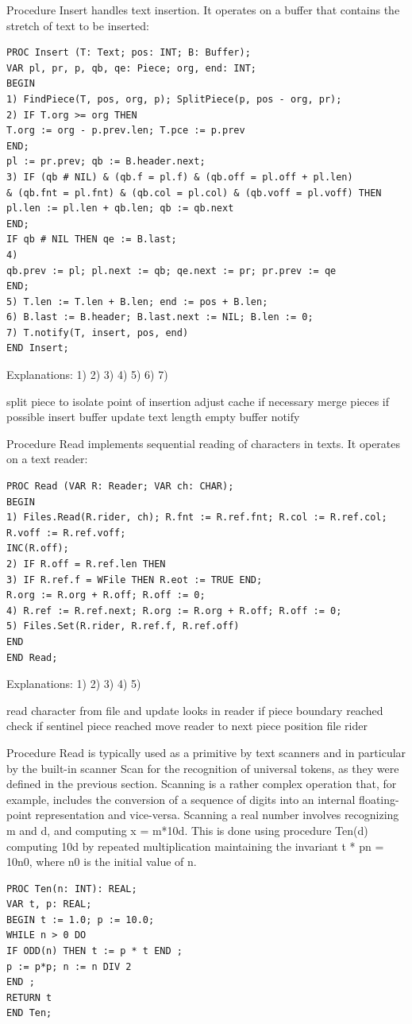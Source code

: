 Procedure Insert handles text insertion. It operates on a buffer that contains the stretch of text to be inserted:
\begin{verbatim}
PROC Insert (T: Text; pos: INT; B: Buffer);
VAR pl, pr, p, qb, qe: Piece; org, end: INT;
BEGIN
1) FindPiece(T, pos, org, p); SplitPiece(p, pos - org, pr);
2) IF T.org >= org THEN
T.org := org - p.prev.len; T.pce := p.prev
END;
pl := pr.prev; qb := B.header.next;
3) IF (qb # NIL) & (qb.f = pl.f) & (qb.off = pl.off + pl.len)
& (qb.fnt = pl.fnt) & (qb.col = pl.col) & (qb.voff = pl.voff) THEN
pl.len := pl.len + qb.len; qb := qb.next
END;
IF qb # NIL THEN qe := B.last;
4)
qb.prev := pl; pl.next := qb; qe.next := pr; pr.prev := qe
END;
5) T.len := T.len + B.len; end := pos + B.len;
6) B.last := B.header; B.last.next := NIL; B.len := 0;
7) T.notify(T, insert, pos, end)
END Insert;
\end{verbatim}

Explanations:
1)
2)
3)
4)
5)
6)
7)

split piece to isolate point of insertion
adjust cache if necessary
merge pieces if possible
insert buffer
update text length
empty buffer
notify

Procedure Read implements sequential reading of characters in texts. It operates on a text reader:
\begin{verbatim}
PROC Read (VAR R: Reader; VAR ch: CHAR);
BEGIN
1) Files.Read(R.rider, ch); R.fnt := R.ref.fnt; R.col := R.ref.col; R.voff := R.ref.voff;
INC(R.off);
2) IF R.off = R.ref.len THEN
3) IF R.ref.f = WFile THEN R.eot := TRUE END;
R.org := R.org + R.off; R.off := 0;
4) R.ref := R.ref.next; R.org := R.org + R.off; R.off := 0;
5) Files.Set(R.rider, R.ref.f, R.ref.off)
END
END Read;
\end{verbatim}

Explanations:
1)
2)
3)
4)
5)

read character from file and update looks in reader
if piece boundary reached
check if sentinel piece reached
move reader to next piece
position file rider

Procedure Read is typically used as a primitive by text scanners and in particular by the built-in
scanner Scan for the recognition of universal tokens, as they were defined in the previous section.
Scanning is a rather complex operation that, for example, includes the conversion of a sequence of
digits into an internal floating-point representation and vice-versa. Scanning a real number involves
recognizing m and d, and computing x = m*10d. This is done using procedure Ten(d) computing 10d
by repeated multiplication maintaining the invariant t * pn = 10n0, where n0 is the initial value of n.
\begin{verbatim}
PROC Ten(n: INT): REAL;
VAR t, p: REAL;
BEGIN t := 1.0; p := 10.0;
WHILE n > 0 DO
IF ODD(n) THEN t := p * t END ;
p := p*p; n := n DIV 2
END ;
RETURN t
END Ten;
\end{verbatim}


